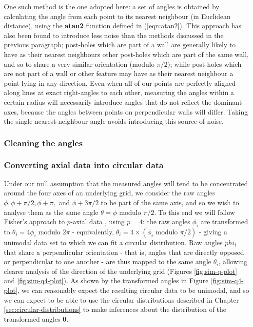 \documentclass[../../ArchStats.tex]{subfiles}
\begin{document}
One such method is the one adopted here: a set of angles is obtained by calculating the angle from each point to its nearest neighbour (in Euclidean distance), using the \textbf{atan2} function defined in (\ref{eqn:atan2}). This approach has also been found to introduce less noise than the methods discussed in the previous paragraph; post-holes which are part of a wall are generally likely to have as their nearest neighbours other post-holes which are part of the same wall, and so to share a very similar orientation (modulo $\pi/2$); while post-holes which are not part of a wall or other feature may have as their nearest neighbour a point lying in any direction. Even when all of our points are perfectly aligned along lines at exact right-angles to each other, measuring the angles within a certain radius will necessarily introduce angles that do not reflect the dominant axes, because the angles between points on perpendicular walls will differ. Taking the single nearest-neighbour angle avoids introducing this source of noise. 

\subsubsection{Cleaning the angles}




\subsubsection{Converting axial data into circular data}
Under our null assumption that the measured angles will tend to be concentrated around the four axes of an underlying grid, we consider the raw angles $\phi, \phi + \pi/2, \phi + \pi,$ and $\phi + 3\pi/2$ to be part of the same axis, and so we wish to analyse them as the same angle $\theta = \phi \text{ modulo }\pi/2$.
To this end we will follow Fisher's approach to $p$-axial data \cite{Fisher1993}, using $p=4$: the raw angles $\phi_i$ are transformed to $\theta_i = 4\phi_i \text{ modulo } 2\pi$ - equivalently, $\theta_i = 4 \times (\phi_i \text{ modulo }\pi/2)$ - giving a unimodal data set to which we can fit a circular distribution. Raw angles $phi_i$ that share a perpendicular orientation - that is, angles that are directly opposed or perpendicular to one another - are thus mapped to the same angle $\theta_i$, allowing clearer analysis of the direction of the underlying grid (Figures \ref{fig:sim-q-plot} and \ref{fig:sim-q4-plot}). As shown by the transformed angles in Figure \ref{fig:sim-q4-plot}, we can reasonably expect the resulting circular data to be unimodal, and so we can expect to be able to use the circular distributions described in Chapter \ref{sec:circular-distributions} to make inferences about the distribution of the transformed angles $\mathbf{\theta}$.
\end{document}
